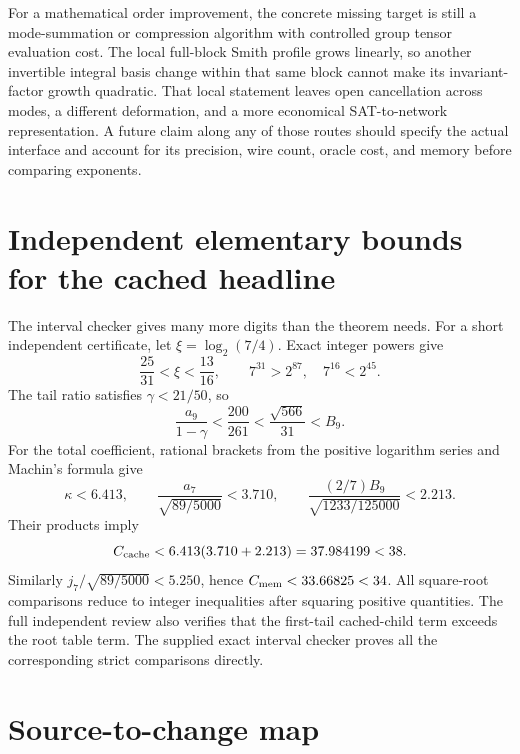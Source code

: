 For a mathematical order improvement, the concrete missing target is
still a mode-summation or compression algorithm with controlled group
tensor evaluation cost. The local full-block Smith profile grows linearly,
so another invertible integral basis change within that same block cannot
make its invariant-factor growth quadratic. That local statement leaves
open cancellation across modes, a different deformation, and a more
economical SAT-to-network representation. A future claim along any of
those routes should specify the actual interface and account for its
precision, wire count, oracle cost, and memory before comparing exponents.

\appendix
\section{Independent elementary bounds for the cached headline}

The interval checker gives many more digits than the theorem needs. For
a short independent certificate, let $\xi=\log_2(7/4)$. Exact integer
powers give
\[
 \frac{25}{31}<\xi<\frac{13}{16},\qquad
 7^{31}>2^{87},\quad 7^{16}<2^{45}.
\]
The tail ratio satisfies $\gamma<21/50$, so
\[
 \frac{a_9}{1-\gamma}<\frac{200}{261}
 <\frac{\sqrt{566}}{31}<B_9.
\]
For the total coefficient, rational brackets from the positive logarithm
series and Machin's formula give
\[
 \kappa<6.413,\qquad
 \frac{a_7}{\sqrt{89/5000}}<3.710,\qquad
 \frac{(2/7)B_9}{\sqrt{1233/125000}}<2.213.
\]
Their products imply
\[
 C_{\rm cache}<6.413(3.710+2.213)=37.984199<38.
\]
Similarly $j_7/\sqrt{89/5000}<5.250$, hence
$C_{\rm mem}<33.66825<34$. All square-root comparisons reduce to
integer inequalities after squaring positive quantities. The full
independent review also verifies that the first-tail cached-child term
exceeds the root table term. The supplied exact interval checker proves
all the corresponding strict comparisons directly.

\section{Source-to-change map}

